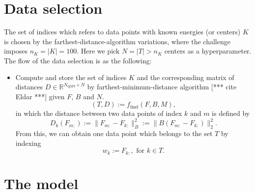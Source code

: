 \documentclass[12pt]{article}
\def\att{                    %
        \marginpar[ \hspace*{\fill} \raisebox{-0.2em}{\rule{2mm}{1.2em}} ]
        {\raisebox{-0.2em}{\rule{2mm}{1.2em}} }
        }
\def\at#1{[*** \att #1 ***]}  %
\begin{document}
\section{Data selection}
\label{sec:data}
The set of indices which refers to data points with known energies (or centers) $K$ is chosen by the farthest-distance-algorithm variations, where the challenge imposes $n_K = |K| = 100$. Here we pick $N = |T| > n_K$ centers as a hyperparameter. The flow of the data selection is as the following:
\begin{itemize}
	\item Compute and store the set of indices $K$ and the corresponding matrix of distances $D \in \mathbb{R}^{N_\text{QM9} \times N}$ by farthest-minimum-distance algorithm \at{cite Eldar} given $F$, $B$ and $N$.
	\begin{equation}
		(T, D) := f_{\text{fmd}}(F, B, M),
	\end{equation}
	in which the distance between two data points of index $k$ and $m$ is defined by
	\begin{equation}
		D_k(F_{m:}) := \|F_{m:} - F_{k:}\|^2_B := \|B(F_{m:} - F_{k:})\|^2_2.
	\end{equation}
	From this, we can obtain one data point which belongs to the set $T$ by indexing
	\begin{equation}
		w_k := F_{k:}, \text{ for } k \in T.
	\end{equation}
\end{itemize}

\section{The model}
\label{sec:model}
\end{document}
